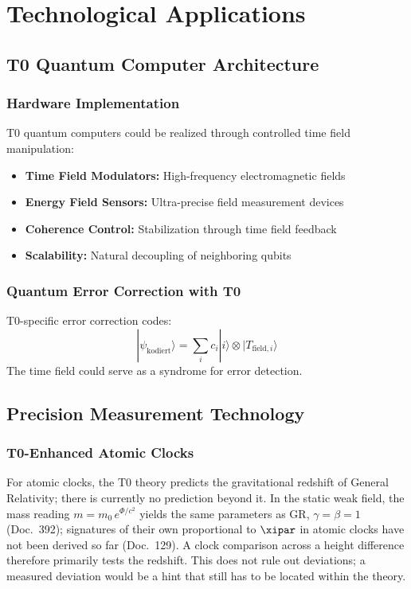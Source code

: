 	\section{Technological Applications}
	\subsection{T0 Quantum Computer Architecture}
	\subsubsection{Hardware Implementation}
	T0 quantum computers could be realized through controlled time field manipulation:
	\begin{itemize}
		\item \textbf{Time Field Modulators:} High-frequency electromagnetic fields
		\item \textbf{Energy Field Sensors:} Ultra-precise field measurement devices
		\item \textbf{Coherence Control:} Stabilization through time field feedback
		\item \textbf{Scalability:} Natural decoupling of neighboring qubits
	\end{itemize}
	\subsubsection{Quantum Error Correction with T0}
	T0-specific error correction codes:
	\begin{equation}
		|\psi_{\text{kodiert}}\rangle = \sum_i c_i |i\rangle \otimes |T_{\text{field},i}\rangle
	\end{equation}
	The time field could serve as a syndrome for error detection.
	\subsection{Precision Measurement Technology}
	\subsubsection{T0-Enhanced Atomic Clocks}
	For atomic clocks, the T0 theory predicts the gravitational redshift of General Relativity; there is currently no prediction beyond it. In the static weak field, the mass reading $m = m_0\,e^{\Phi/c^2}$ yields the same parameters as GR, $\gamma = \beta = 1$ (Doc.~392); signatures of their own proportional to $\xipar$ in atomic clocks have not been derived so far (Doc.~129). A clock comparison across a height difference therefore primarily tests the redshift. This does not rule out deviations; a measured deviation would be a hint that still has to be located within the theory.

